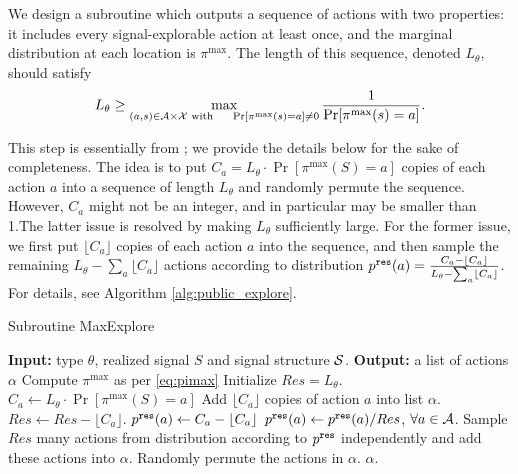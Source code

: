 We design a subroutine  which outputs a sequence of actions with two properties: it includes every signal-explorable action at least once, and the marginal distribution at each location is $\pi^{\max}$. The length of this sequence, denoted $L_{\theta}$, should satisfy
\begin{align}\label{eq:public-L}
L_{\theta} \geq \max_{(a,s)\in \A\times \X \text{ with }\quad \Pr[\pi^{\max}(s)=a] \neq 0} \frac{1}{\Pr[\pi^{\max}(s)=a]}.
\end{align}

This step is essentially from \cite{ICexplorationGames-ec16-working}; we provide the details below for the sake of completeness.
The idea is to put $C_a = L_{\theta} \cdot \Pr[\pi^{\max}(S) = a]$ copies of each action $a$ into a sequence of length $L_{\theta}$ and randomly permute the sequence. However, $C_a$ might not be an integer, and in particular may be smaller than 1.The latter issue is resolved by making $L_{\theta}$ sufficiently large. For the former issue, we first put $\lfloor C_a \rfloor$ copies of each action $a$ into the sequence, and then sample the remaining
    $L_\theta - \sum_a \lfloor C_a \rfloor$
actions according to distribution
    $\pRes(a) = \frac{C_a - \lfloor C_a \rfloor}{L_\theta - \sum_a \lfloor C_a \rfloor}$.
For details, see Algorithm \ref{alg:public_explore}.
 \begin{algorithm}[H]
    \caption{Subroutine MaxExplore}
    	\label{alg:public_explore}
    \begin{algorithmic}[1]
	\STATE \textbf{Input:} type $\theta$, realized signal $S$ and signal structure $\S$.
	\STATE \textbf{Output:} a list of actions $\alpha$
	\STATE Compute $\pi^{\max}$ as per \eqref{eq:pimax}
		\STATE Initialize $Res = L_{\theta}$.
							\STATE $C_a \leftarrow  L_{\theta} \cdot \Pr[\pi^{\max}(S) = a]$
                     		\STATE Add $\lfloor C_a \rfloor$ copies of action $a$ into list $\alpha$.
			\STATE $Res \leftarrow Res -\lfloor C_a \rfloor $.
			\STATE $\pRes(a)\leftarrow  C_a -  \lfloor C_a\rfloor$
		\ENDFOR
		\STATE $\pRes(a) \leftarrow \pRes(a) / Res$, $\forall a \in \A$.
		\STATE Sample $Res$ many actions from distribution according to $\pRes$ independently and add these actions into $\alpha$.
		\STATE Randomly permute the actions in $\alpha$.
	\RETURN $\alpha$.	
     \end{algorithmic}
\end{algorithm}

